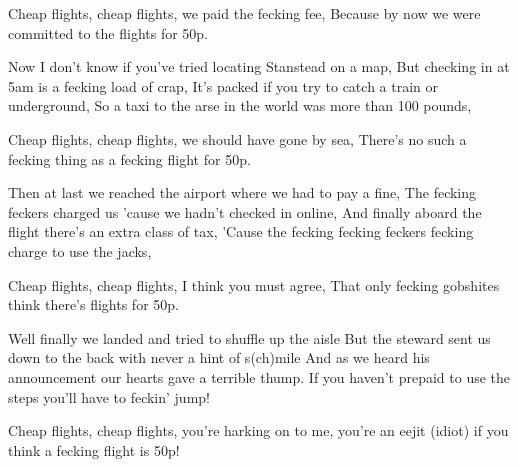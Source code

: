     \beginchorus\replay[chorus]
        Cheap flights, cheap flights, we paid the fecking fee,
        Because by now we were committed to the flights for 50p.
    \endchorus

    \beginverse\replay[verse]
        Now I don't know if you've tried locating Stanstead on a map,
        But checking in at 5am is a fecking load of crap,
        It's packed if you try to catch a train or underground,
        So a taxi to the arse in the world was more than 100 pounds,
    \endverse

    \beginchorus\replay[chorus]
        Cheap flights, cheap flights, we should have gone by sea,
        There's no such a fecking thing as a fecking flight for 50p.
    \endchorus

    \beginverse\replay[verse]
        Then at last we reached the airport where we had to pay a fine,
        The fecking feckers charged us 'cause we hadn't checked in online,
        And finally aboard the flight there's an extra class of tax,
        'Cause the fecking fecking feckers fecking charge to use the jacks,
    \endverse

    \beginchorus\replay[chorus]
        Cheap flights, cheap flights, I think you must agree,
        That only fecking gobshites think there's flights for 50p.
    \endchorus

    \beginverse\replay[verse]
        Well finally we landed and tried to shuffle up the aisle
        But the steward sent us down to the back with never a hint of s(ch)mile
        And as we heard his announcement our hearts gave a terrible thump.
        If you haven't prepaid to use the steps you'll have to feckin' jump!
    \endverse

    \beginchorus\replay[chorus]
        Cheap flights, cheap flights, you're harking on to me,
        you're an eejit (idiot) if you think a fecking flight is 50p!
    \endchorus
\endsong
